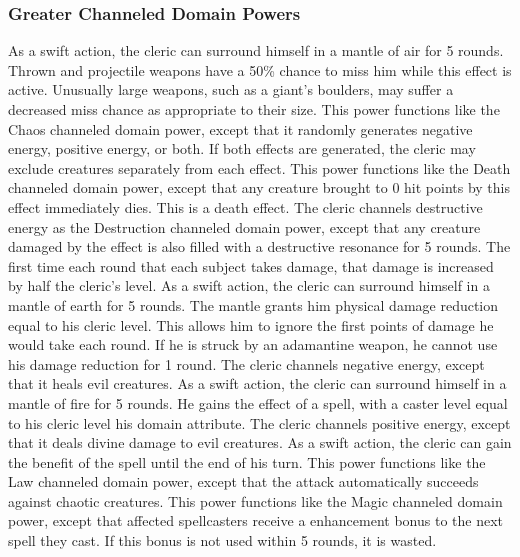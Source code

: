 \subsubsection{Greater Channeled Domain Powers}

 As a swift action, the cleric can surround himself in a mantle of air for 5 rounds. Thrown and projectile weapons have a 50\% chance to miss him while this effect is active. Unusually large weapons, such as a giant's boulders, may suffer a decreased miss chance as appropriate to their size.
 This power functions like the Chaos channeled domain power, except that it randomly generates negative energy, positive energy, or both. If both effects are generated, the cleric may exclude creatures separately from each effect. 
 This power functions like the Death channeled domain power, except that any creature brought to 0 hit points by this effect immediately dies. This is a death effect.
 The cleric channels destructive energy as the Destruction channeled domain power, except that any creature damaged by the effect is also filled with a destructive resonance for 5 rounds. The first time each round that each subject takes damage, that damage is increased by half the cleric's level.
 As a swift action, the cleric can surround himself in a mantle of earth for 5 rounds. The mantle grants him physical damage reduction equal to his cleric level. This allows him to ignore the first points of damage he would take each round. If he is struck by an adamantine weapon, he cannot use his damage reduction for 1 round.
 The cleric channels negative energy, except that it heals evil creatures. 
 As a swift action, the cleric can surround himself in a mantle of fire for 5 rounds. He gains the effect of a  spell, with a caster level equal to his cleric level \add his domain attribute.
 The cleric channels positive energy, except that it deals divine damage to evil creatures. 
 As a swift action, the cleric can gain the benefit of the  spell until the end of his turn.
 This power functions like the Law channeled domain power, except that the attack automatically succeeds against chaotic creatures.
 This power functions like the Magic channeled domain power, except that affected spellcasters receive a  enhancement bonus to the next spell they cast. If this bonus is not used within 5 rounds, it is wasted. 
